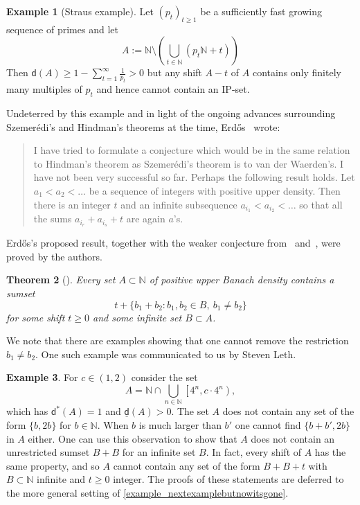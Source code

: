 \documentclass[10pt,dvipsnames]{article}
\newtheorem{theorem}{Theorem}[section]
\theoremstyle{definition}
\newtheorem{example}[theorem]{Example}
\theoremstyle{plain}
\newcommand{\N}{\mathbb{N}}
\newcommand{\dens}{\mathsf{d}}
\newcommand{\ldens}{\underline{\mathsf{d}}}
\newcommand{\ubdens}{\mathsf{d}^*}
\newcommand{\Erdos}{Erd\H{o}s}
\newcommand{\Szemeredi}{Szemer\'{e}di}
\begin{document}
\begin{example}[Straus example]
\label{example_straus}
Let $(p_t)_{t\geq 1}$ be a sufficiently fast growing sequence of primes and let
$$A:=\N\setminus\left(\bigcup_{t\in\N}(p_t\N+t)\right)$$
Then $\dens(A)\geq1-\sum_{t=1}^\infty\frac1{p_t}>0$ but any shift $A-t$ of $A$ contains only finitely many multiples of $p_t$ and hence cannot contain an IP-set.
\end{example}

Undeterred by this example and in light of the ongoing advances surrounding \Szemeredi{}'s and Hindman's theorems at the time, \Erdos{}~\cite[Page~305]{erdos-1975} wrote: 
\begin{quote}
I have tried to formulate a conjecture which would be in the same relation to Hindman's theorem as \Szemeredi{}'s theorem is to van der Waerden's. I have not been very successful so far.
Perhaps the following result holds.
Let $a_1 < a_2 < \dots$ be a sequence of integers with positive upper density.
Then there is an integer $t$ and an infinite subsequence $a_{i_1} < a_{i_2} < \dots$ so that all the sums $a_{i_r} + a_{i_s} + t$ are again $a$'s.
\end{quote}
\Erdos{}'s proposed result, together with the weaker conjecture from~\cite[Pages 57--58]{erdos-1977} and~\cite[Page 105]{erdos-1980}, were proved by the authors.

\begin{theorem}[{\cite[Theorem 1.2, part (i)]{KMRR2}}]
\label{thm_BBt}
    Every set $A\subset\N$ of positive upper Banach density contains a sumset
\[t+\big\{ b_1+b_2:b_1,b_2\in B,~b_1\neq b_2 \big\}\]
for some shift $t\geq0$ and some infinite set $B \subset A$.
\end{theorem}

We note that there are examples showing that one cannot remove the restriction $b_1\neq b_2$.
One such example was communicated to us by Steven Leth. 


\begin{example}
\label{eg:not2b}
For $c\in(1,2)$ consider the set
\begin{equation}
\label{eq_archemedianobstructions}
A
=
\N \cap \bigcup_{n\in\N}\left[4^{n},c\cdot4^{n}\right),
\end{equation}
which has $\ubdens(A)=1$ and $\ldens(A)>0$.
The set $A$ does not contain any set of the form $\{b, 2b\}$ for $b \in \N$.
When $b$ is much larger than $b'$ one cannot find $\{b+b',2b\}$ in $A$ either.
One can use this observation to show that $A$ does not contain an unrestricted sumset $B+B$ for an infinite set $B$.
In fact, every shift of $A$ has the same property, and so $A$ cannot contain any set of the form $B+B+t$ with $B \subset \N$ infinite and $t\geq 0$ integer.
The proofs of these statements are deferred to the more general setting of \cref{example_nextexamplebutnowitsgone}.
\end{example}
\end{document}
